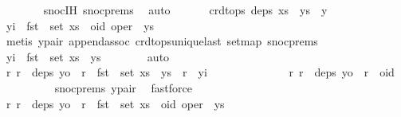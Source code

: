 \begin{isabellebody}
\ \ \ \ \ \ \isamarkupfalse%
\ snoc{\isachardot}IH\ snoc{\isachardot}prems{\isacharparenleft}{}{\isacharparenright}\ \isamarkupfalse%
\ auto\isanewline
\ \ \isamarkupfalse%
\isanewline
\ \ \isamarkupfalse%
\ {\isachardoublequoteopen}crdt{\isacharunderscore}ops\ deps\ {\isacharparenleft}xs\ {\isacharat}\ ys\ {\isacharat}\ {\isacharbrackleft}y{\isacharbrackright}{\isacharparenright}{\isachardoublequoteclose}\isanewline
\ \ \isamarkupfalse%
\ {\isacharminus}\isanewline
\ \ \ \ \isamarkupfalse%
\ {\isachardoublequoteopen}yi\ {\isasymnotin}\ fst\ {\isacharbackquote}\ set\ {\isacharparenleft}xs\ {\isacharat}\ {\isacharbrackleft}{\isacharparenleft}oid{\isacharcomma}\ oper{\isacharparenright}{\isacharbrackright}\ {\isacharat}\ ys{\isacharparenright}{\isachardoublequoteclose}\isanewline
\ \ \ \ \ \ \isamarkupfalse%
\ {\isacharparenleft}metis\ y{\isacharunderscore}pair\ append{\isacharunderscore}assoc\ crdt{\isacharunderscore}ops{\isacharunderscore}unique{\isacharunderscore}last\ set{\isacharunderscore}map\ snoc{\isachardot}prems{\isacharparenleft}{}{\isacharparenright}{\isacharparenright}\isanewline
\ \ \ \ \isamarkupfalse%
\ {\isachardoublequoteopen}yi\ {\isasymnotin}\ fst\ {\isacharbackquote}\ set\ {\isacharparenleft}xs\ {\isacharat}\ ys{\isacharparenright}{\isachardoublequoteclose}\isanewline
\ \ \ \ \ \ \isamarkupfalse%
\ auto\isanewline
\ \ \ \ \isamarkupfalse%
\ \isamarkupfalse%
\ {\isachardoublequoteopen}{\isasymAnd}r{\isachardot}\ r\ {\isasymin}\ deps\ yo\ {\isasymLongrightarrow}\ r\ {\isasymin}\ fst\ {\isacharbackquote}\ set\ {\isacharparenleft}xs\ {\isacharat}\ ys{\isacharparenright}\ {\isasymand}\ r\ {\isacharless}\ yi{\isachardoublequoteclose}\isanewline
\ \ \ \ \isamarkupfalse%
\ {\isacharminus}\isanewline
\ \ \ \ \ \ \isamarkupfalse%
\ {\isachardoublequoteopen}{\isasymAnd}r{\isachardot}\ r\ {\isasymin}\ deps\ yo\ {\isasymLongrightarrow}\ r\ {\isasymnoteq}\ oid{\isachardoublequoteclose}\isanewline
\ \ \ \ \ \ \ \ \isamarkupfalse%
\ snoc{\isachardot}prems{\isacharparenleft}{}{\isacharparenright}\ y{\isacharunderscore}pair\ \isamarkupfalse%
\ fastforce\isanewline
\ \ \ \ \ \ \isamarkupfalse%
\ \isamarkupfalse%
\ {\isachardoublequoteopen}{\isasymAnd}r{\isachardot}\ r\ {\isasymin}\ deps\ yo\ {\isasymLongrightarrow}\ r\ {\isasymin}\ fst\ {\isacharbackquote}\ set\ {\isacharparenleft}xs\ {\isacharat}\ {\isacharbrackleft}{\isacharparenleft}oid{\isacharcomma}\ oper{\isacharparenright}{\isacharbrackright}\ {\isacharat}\ ys{\isacharparenright}{\isachardoublequoteclose}\isanewline

\end{isabellebody}
